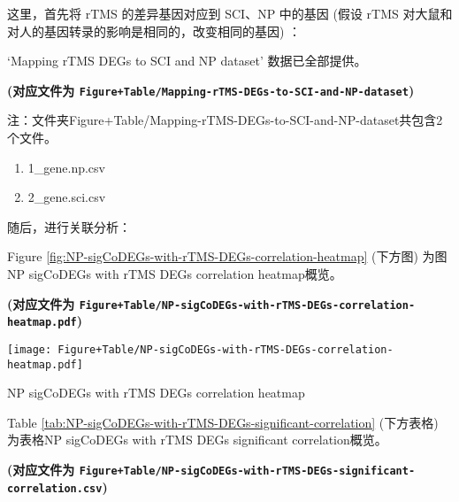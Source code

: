 \documentclass[
]{article}
\providecommand{\tightlist}{%
  \setlength{\itemsep}{0pt}\setlength{\parskip}{0pt}}
\begin{document}
这里，首先将 rTMS 的差异基因对应到 SCI、NP 中的基因 (假设 rTMS 对大鼠和对人的基因转录的影响是相同的，改变相同的基因) ：

`Mapping rTMS DEGs to SCI and NP dataset' 数据已全部提供。

\textbf{(对应文件为 \texttt{Figure+Table/Mapping-rTMS-DEGs-to-SCI-and-NP-dataset})}

\begin{center}\begin{tcolorbox}[colback=gray!10, colframe=gray!50, width=0.9\linewidth, arc=1mm, boxrule=0.5pt]注：文件夹Figure+Table/Mapping-rTMS-DEGs-to-SCI-and-NP-dataset共包含2个文件。

\begin{enumerate}\tightlist
\item 1\_gene.np.csv
\item 2\_gene.sci.csv
\end{enumerate}\end{tcolorbox}
\end{center}

随后，进行关联分析：

Figure \ref{fig:NP-sigCoDEGs-with-rTMS-DEGs-correlation-heatmap} (下方图) 为图NP sigCoDEGs with rTMS DEGs correlation heatmap概览。

\textbf{(对应文件为 \texttt{Figure+Table/NP-sigCoDEGs-with-rTMS-DEGs-correlation-heatmap.pdf})}

\def\@captype{figure}
\begin{center}
\texttt{[image: Figure+Table/NP-sigCoDEGs-with-rTMS-DEGs-correlation-heatmap.pdf]}
\caption{NP sigCoDEGs with rTMS DEGs correlation heatmap}\label{fig:NP-sigCoDEGs-with-rTMS-DEGs-correlation-heatmap}
\end{center}

Table \ref{tab:NP-sigCoDEGs-with-rTMS-DEGs-significant-correlation} (下方表格) 为表格NP sigCoDEGs with rTMS DEGs significant correlation概览。

\textbf{(对应文件为 \texttt{Figure+Table/NP-sigCoDEGs-with-rTMS-DEGs-significant-correlation.csv})}
\end{document}
